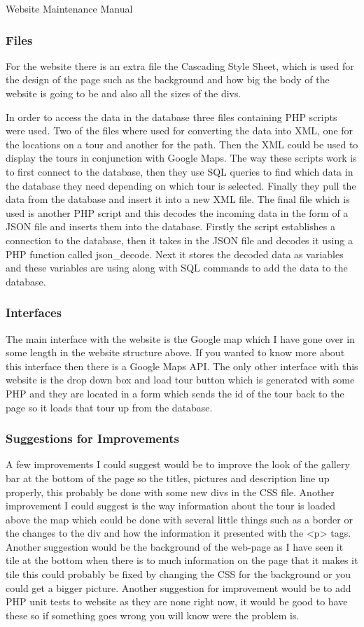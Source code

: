 \documentclass{article}
\begin{document}
\begin{section}{Website Maintenance Manual}
		\subsubsection{Files}
		For the website there is an extra file the Cascading Style Sheet, which is used for the design of the page such as the background and how big the body of the website is going to be and also all the sizes of the divs.

		In order to access the data in the database three files containing PHP scripts were used. Two of the files where used for converting the data into XML, one for the locations on a tour and another for the path. Then the XML could be used to display the tours in conjunction with Google Maps. The way these scripts work is to first connect to the database, then they use SQL queries to find which data in the database they need depending on which tour is selected. Finally they pull the data from the database and insert it into a new XML file. The final file which is used is another PHP script and this decodes the incoming data in the form of a JSON file and inserts them into the database. Firstly the script establishes a connection to the database, then it takes in the JSON file and decodes it using a PHP function called json\_decode. Next it stores the decoded data as variables and these variables are using along with SQL commands to add the data to the database. 

		\subsubsection{Interfaces}
		The main interface with the website is the Google map which I have gone over in some length in the website structure above. If you wanted to know more about this interface then there is a Google Maps API. The only other interface with this website is the drop down box and load tour button which is generated with some PHP and they are located in a form which sends the id of the tour back to the page so it loads that tour up from the database.

		\subsubsection{Suggestions for Improvements}
		A few improvements I could suggest would be to improve the look of the gallery bar at the bottom of the page so the titles, pictures and description line up properly, this probably be done with some new divs in the CSS file. Another improvement I could suggest  is the way information about the tour is loaded above the map which could be done with several little things such as a border or the changes to the div and how the information it presented with the <p> tags. Another suggestion would be the background of the web-page as I have seen it tile at the bottom when there is to much information on the page that it makes it tile this could probably be fixed by changing the CSS for the background or you could get a bigger picture.
		Another suggestion for improvement would be to add PHP unit tests to website as they are none right now, it would be good to have these so if something goes wrong you will know were the problem is.



\end{section}
\end{document}
